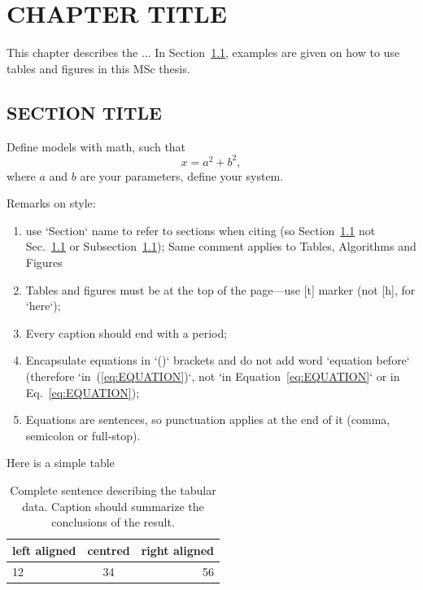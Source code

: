\chapter{CHAPTER TITLE}
\label{chp:chapter_1}

This chapter describes the ... In Section~\ref{sec:SECTIONTITLE}, examples are given on how to use tables and figures in this MSc thesis.

\section{SECTION TITLE}
\label{sec:SECTIONTITLE}


Define models with math, such that
%
\begin{equation}
x = a^2 + b^2,
\label{eq:EQUATION}
\end{equation}
%
where $a$ and $b$ are your parameters, define your system.

Remarks on style:

\begin{enumerate}
	\item use `Section` name to refer to sections when citing (so Section~\ref{sec:SECTIONTITLE} not Sec.~\ref{sec:SECTIONTITLE} or Subsection~\ref{sec:SECTIONTITLE}); Same comment applies to Tables, Algorithms and Figures
	\item Tables and figures must be at the top of the page---use [t] marker (not [h], for `here`); 
	\item Every caption should end with a period;
	\item Encapsulate equations in `()` brackets and do not add word `equation before` (therefore `in~(\ref{eq:EQUATION})`, not `in Equation~\ref{eq:EQUATION}` or in Eq.~\ref{eq:EQUATION});
	\item Equations are sentences, so punctuation applies at the end of it (comma, semicolon or full-stop).
\end{enumerate}

Here is a simple table

\begin{table}[t]
\centering
\begin{tabular}{| l | c | r |}
\hline
left aligned & centred & right aligned \\
\hline \hline
12 & 34 & 56 \\
\hline
\end{tabular}
\caption{Complete sentence describing the tabular data. Caption should summarize the conclusions of the result.}
\label{tab:table_1}
\end{table}

